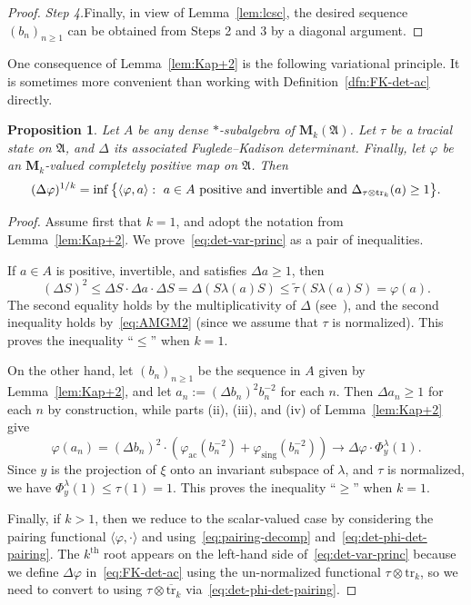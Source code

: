 \documentclass[12pt,a4paper]{article}
\numberwithin{equation}{section}
\newtheorem{prop}[thm]{Proposition}
\theoremstyle{remark}
\renewcommand{\rm}[1]{\mathrm{#1}}
\newcommand{\rmM}{\mathbf{M}}
\newcommand{\A}{\mathfrak{A}}
\renewcommand{\phi}{\varphi}
\renewcommand{\l}{\lambda}
\renewcommand{\t}[1]{\widetilde{#1}}
\newcommand{\tr}{\overline{\mathrm{tr}}}
\newcommand{\Tr}{\mathrm{tr}}
\begin{document}
\begin{proof}
\vspace{7pt}

\emph{Step 4.}\quad Finally, in view of Lemma~\ref{lem:lcsc}, the desired sequence $(b_n)_{n\ge 1}$ can be obtained from Steps 2 and 3 by a diagonal argument.
\end{proof}

One consequence of Lemma~\ref{lem:Kap+2} is the following variational principle.  It is sometimes more convenient than working with Definition~\ref{dfn:FK-det-ac} directly.

\begin{prop}\label{prop:det-var-princ}
Let $A$ be any dense $\ast$-subalgebra of $\rmM_k(\A)$. Let $\tau$ be a tracial state on $\A$, and $\Delta$ its associated Fuglede--Kadison determinant.  Finally, let $\phi$ be an $\rmM_k$-valued completely positive map on $\A$.  Then
\begin{equation}\label{eq:det-var-princ}
(\Delta \phi)^{1/k} = \inf\big\{\langle \phi,a\rangle:\ a \in A\ \hbox{positive and invertible and}\ \Delta_{\tau\otimes \Tr_k}(a) \ge 1\big\}.
\end{equation}
\end{prop}

\begin{proof}
Assume first that $k=1$, and adopt the notation from Lemma~\ref{lem:Kap+2}.  We prove~\eqref{eq:det-var-princ} as a pair of inequalities.

If $a \in A$ is positive, invertible, and satisfies $\Delta a \ge 1$, then
\[(\Delta S)^2 \le \Delta S\cdot \Delta a \cdot \Delta S = \Delta (S\l(a)S) \le \t{\tau}(S\l(a)S) = \phi(a).\]
The second equality holds by the multiplicativity of $\Delta$ (see~\cite[Prop. 2.5]{HaaSch07}), and the second inequality holds by~\eqref{eq:AMGM2} (since we assume that $\tau$ is normalized).  This proves the inequality ``$\le$'' when $k=1$.

On the other hand, let $(b_n)_{n \ge 1}$ be the sequence in $A$ given by Lemma~\ref{lem:Kap+2}, and let $a_n := (\Delta b_n)^2b_n^{-2}$ for each $n$.  Then $\Delta a_n \ge 1$ for each $n$ by construction, while parts (ii), (iii), and (iv) of Lemma~\ref{lem:Kap+2} give
\[\phi(a_n) = (\Delta b_n)^2\cdot(\phi_{\rm{ac}}(b_n^{-2}) + \phi_{\rm{sing}}(b_n^{-2})) \to \Delta \phi \cdot \Phi^\l_y(1).\]
Since $y$ is the projection of $\xi$ onto an invariant subspace of $\l$, and $\tau$ is normalized, we have $\Phi^\l_y(1) \le \tau(1) = 1$.  This proves the inequality ``$\ge$'' when $k=1$.

Finally, if $k > 1$, then we reduce to the scalar-valued case by considering the pairing functional $\langle \phi,\cdot\rangle$ and using~\eqref{eq:pairing-decomp} and~\eqref{eq:det-phi-det-pairing}.  The $k^{\rm{th}}$ root appears on the left-hand side of~\eqref{eq:det-var-princ} because we define $\Delta\phi$ in~\eqref{eq:FK-det-ac} using the un-normalized functional $\tau \otimes \Tr_k$, so we need to convert to using $\tau\otimes \tr_k$ via~\eqref{eq:det-phi-det-pairing}.
\end{proof}
\end{document}
